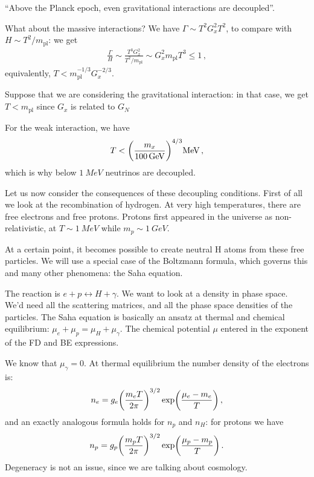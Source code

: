 \documentclass[main.tex]{subfiles}
\begin{document}
``Above the Planck epoch, even gravitational interactions are decoupled''.

What about the massive interactions? We have \(\Gamma \sim T^2 G_x^2 T^2\), to compare with \(H \sim T^2/ m _{\text{pl}}\): we get 
%
\begin{align}
  \frac{\Gamma}{H} \sim \frac{T^3 G_x^2}{T^2 / m _{\text{pl}}} \sim G_x^2 m _{\text{pl}} T^3 \leq 1
\,,
\end{align}
%
equivalently, \(T < m _{\text{pl}}^{-1/3} G_x^{-2/3}\).

Suppose that we are considering the gravitational interaction: in that case, we get \(T < m _{\text{pl}}\) since \(G_x\) is related to \( G_N\) 


For the weak interaction, we have 
%
\begin{align}
    T < \qty(\frac{m_x}{\SI{100}{GeV}})^{4/3} \SI{}{MeV}
\,,
\end{align}
%
which is why below \(\SI{1}{MeV}\) neutrinos are decoupled.

Let us now consider the consequences of these decoupling conditions.
First of all we look at the recombination of hydrogen.
At very high temperatures, there are free electrons and free protons.
Protons first appeared in the universe as non-relativistic, at \(T \sim \SI{1}{MeV}\) while \(m_p \sim \SI{1}{GeV}\).

At a certain point, it becomes possible to create neutral H atoms from these free particles.
We will use a special case of the Boltzmann formula, which governs this and many other phenomena: the Saha equation.

The reaction is \(e + p \leftrightarrow H + \gamma \). We want to look at a density in phase space.
We'd need all the scattering matrices, and all the phase space densities of the particles.
The Saha equation is basically an ansatz at thermal and chemical equilibrium: \(\mu _e + \mu_p = \mu_H + \mu_\gamma \). The chemical potential \(\mu \) entered in the exponent of the FD and BE expressions.

We know that \(\mu_{\gamma }=0\).
At thermal equilibrium the number density of the electrons is: 
%
\begin{align}
  n_e = g_e \qty(\frac{m_e T}{2 \pi })^{3/2} \exp(\frac{\mu _e - m_e }{T}) 
\,,
\end{align}
%
and an exactly analogous formula holds for \(n_p\) and \(n_H\): for protons we have 
%
\begin{align}
    n_p = g_p \qty(\frac{m_p T}{2 \pi })^{3/2} \exp(\frac{\mu _p - m_p }{T}) 
  \,.
\end{align}
Degeneracy is not an issue, since we are talking about cosmology.
\end{document}
